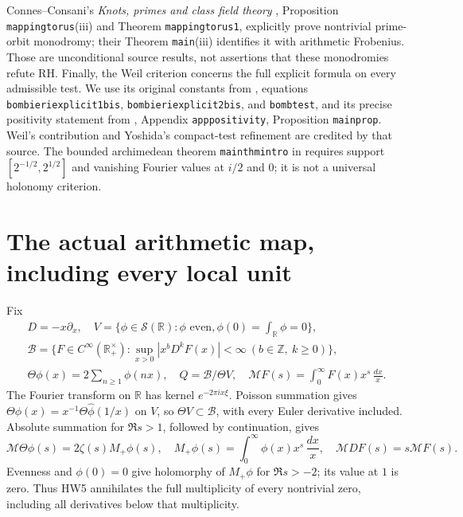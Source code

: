 \documentclass[11pt]{article}
\newcommand{\R}{\mathbb R}
\newcommand{\Z}{\mathbb Z}
\newcommand{\B}{\mathscr B}
\newcommand{\M}{\mathcal M}
\begin{document}
Connes--Consani's \emph{Knots, primes and class field theory}
\cite{CCclass}, Proposition \texttt{mappingtorus}(iii) and
Theorem \texttt{mappingtorus1}, explicitly prove nontrivial
prime-orbit monodromy; their Theorem \texttt{main}(iii) identifies
it with arithmetic Frobenius. Those are unconditional source
results, not assertions that these monodromies refute RH.
Finally, the Weil criterion concerns the full explicit formula
on every admissible test. We use its original constants from
\cite{CCcycles}, equations \texttt{bombieriexplicit1bis},
\texttt{bombieriexplicit2bis}, and \texttt{bombtest}, and its
precise positivity statement from \cite{CCWeil},
Appendix \texttt{apppositivity}, Proposition \texttt{mainprop}.
Weil's contribution and Yoshida's compact-test refinement are
credited by that source. The bounded archimedean theorem
\texttt{mainthmintro} in \cite{CCWeil} requires support
\([2^{-1/2},2^{1/2}]\) and vanishing Fourier values at \(i/2\)
and \(0\); it is not a universal holonomy criterion.

\section{The actual arithmetic map, including every local unit}

Fix
\[
 \begin{gathered}
 D=-x\partial_x,\quad
 V=\{\phi\in\mathcal S(\R):\phi\text{ even},
                   \phi(0)=\int_\R\phi=0\},\\
 \B=\{F\in C^\infty(\R_+^\times):
       \sup_{x>0}|x^bD^kF(x)|<\infty
                    \ (b\in\Z,\ k\ge0)\},\\
 \Theta\phi(x)=2\sum_{n\ge1}\phi(nx),\quad Q=\B/\Theta V,\quad
 \M F(s)=\int_0^\infty F(x)x^s\,\frac{dx}{x}.
 \end{gathered}
 \tag{HW4}\label{hw:spaces}
\]
The Fourier transform on \(\R\) has kernel \(e^{-2\pi ix\xi}\).
Poisson summation gives
\(\Theta\phi(x)=x^{-1}\Theta\widehat\phi(1/x)\) on \(V\),
so \(\Theta V\subset\B\), with every Euler derivative included.
Absolute summation for \(\Re s>1\), followed by continuation, gives
\[
 \M\Theta\phi(s)=2\zeta(s)M_+\phi(s),\quad
 M_+\phi(s)=\int_0^\infty\phi(x)x^s\,\frac{dx}{x},\quad
 \M DF(s)=s\M F(s).
 \tag{HW5}\label{hw:theta}
\]
Evenness and \(\phi(0)=0\) give holomorphy of \(M_+\phi\)
for \(\Re s>-2\); its value at \(1\) is zero. Thus HW5
annihilates the full multiplicity of every nontrivial zero,
including all derivatives below that multiplicity.
\end{document}

